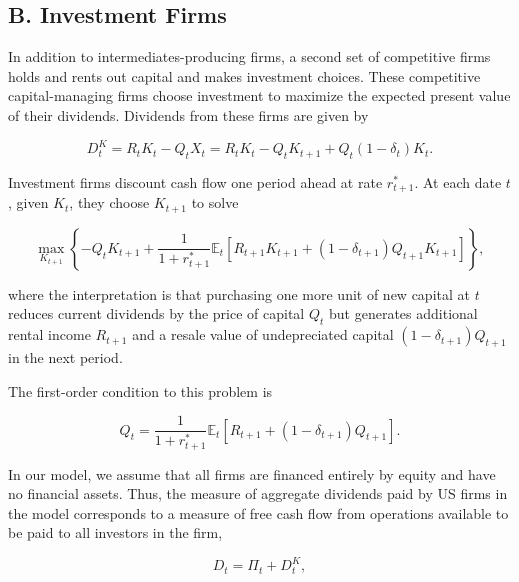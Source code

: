 \documentclass[11pt]{article}
\begin{document}
\subsection*{B. Investment Firms}


In addition to intermediates-producing firms, a second set of competitive firms holds and rents out capital and makes investment choices. These competitive capital-managing firms choose investment to maximize the expected present value of their dividends. Dividends from these firms are given by


\setcounter{equation}{10}
\begin{equation}\label{eq:11}
D_t^K=R_tK_t-Q_tX_t=R_tK_t-Q_tK_{t+1}+Q_t(1-\delta_t)K_t.
\end{equation}


Investment firms discount cash flow one period ahead at rate $r_{t+1}^{*}$. At each date $t$, given $K_{t}$, they choose $K_{t+1}$ to solve


\[
\max_{K_{t+1}}\left\{-Q_tK_{t+1}+\frac{1}{1+r_{t+1}^*}\mathbb{E}_t\left[R_{t+1}K_{t+1}+(1-\delta_{t+1})Q_{t+1}K_{t+1}\right]\right\},
\]


where the interpretation is that purchasing one more unit of new capital at $t$ reduces current dividends by the price of capital $Q_{t}$ but generates additional rental income $R_{t+1}$ and a resale value of undepreciated capital $(1-\delta _{t+1})Q_{t+1}$ in the next period.


The first-order condition to this problem is


\setcounter{equation}{11}
\begin{equation}\label{eq:12}
Q_t=\frac{1}{1+r_{t+1}^*}\mathbb{E}_t\left[R_{t+1}+(1-\delta_{t+1})Q_{t+1}\right].
\end{equation}


In our model, we assume that all firms are financed entirely by equity and have no financial assets. Thus, the measure of aggregate dividends paid by US firms in the model corresponds to a measure of free cash flow from operations available to be paid to all investors in the firm,


\setcounter{equation}{12}
\begin{equation}\label{eq:13}
D_t=\Pi_t+D_t^K,
\end{equation}
\end{document}
